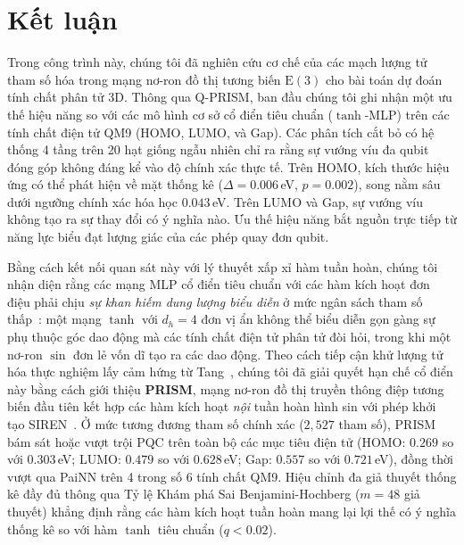 \documentclass[10pt,twocolumn,letterpaper]{article}
\begin{document}
\section{Kết luận}
\label{sec:conclusion}

Trong công trình này, chúng tôi đã nghiên cứu cơ chế của các mạch lượng tử tham số hóa trong mạng nơ-ron đồ thị tương biến $\mathrm{E}(3)$ cho bài toán dự đoán tính chất phân tử 3D.
Thông qua Q-PRISM, ban đầu chúng tôi ghi nhận một ưu thế hiệu năng so với các mô hình cơ sở cổ điển tiêu chuẩn ($\tanh$-MLP) trên các tính chất điện tử QM9 (HOMO, LUMO, và Gap).
Các phân tích cắt bỏ có hệ thống 4 tầng trên 20 hạt giống ngẫu nhiên chỉ ra rằng sự vướng víu đa qubit đóng góp không đáng kể vào độ chính xác thực tế. Trên HOMO, kích thước hiệu ứng có thể phát hiện về mặt thống kê ($\Delta = 0.006$\,eV, $p = 0.002$), song nằm sâu dưới ngưỡng chính xác hóa học $0.043$\,eV. Trên LUMO và Gap, sự vướng víu không tạo ra sự thay đổi có ý nghĩa nào. Ưu thế hiệu năng bắt nguồn trực tiếp từ năng lực biểu đạt lượng giác của các phép quay đơn qubit.

Bằng cách kết nối quan sát này với lý thuyết xấp xỉ hàm tuần hoàn, chúng tôi nhận diện rằng các mạng MLP cổ điển tiêu chuẩn với các hàm kích hoạt đơn điệu phải chịu \textit{sự khan hiếm dung lượng biểu diễn} ở mức ngân sách tham số thấp~\cite{rahaman2019spectral}: một mạng $\tanh$ với $d_h = 4$ đơn vị ẩn không thể biểu diễn gọn gàng sự phụ thuộc góc dao động mà các tính chất điện tử phân tử đòi hỏi, trong khi một nơ-ron $\sin$ đơn lẻ vốn dĩ tạo ra các dao động.
Theo cách tiếp cận khử lượng tử hóa thực nghiệm lấy cảm hứng từ Tang~\cite{Tang:2018lmw}, chúng tôi đã giải quyết hạn chế cổ điển này bằng cách giới thiệu \textbf{PRISM}, mạng nơ-ron đồ thị truyền thông điệp tương biến đầu tiên kết hợp các hàm kích hoạt \textit{nội} tuần hoàn hình sin với phép khởi tạo SIREN~\cite{sitzmann2020siren}.
Ở mức tương đương tham số chính xác ($2{,}527$ tham số), PRISM bám sát hoặc vượt trội PQC trên toàn bộ các mục tiêu điện tử (HOMO: $0.269$ so với $0.303$\,eV; LUMO: $0.479$ so với $0.628$\,eV; Gap: $0.557$ so với $0.721$\,eV), đồng thời vượt qua PaiNN trên 4 trong số 6 tính chất QM9.
Hiệu chỉnh đa giả thuyết thống kê đầy đủ thông qua Tỷ lệ Khám phá Sai Benjamini-Hochberg ($m = 48$ giả thuyết) khẳng định rằng các hàm kích hoạt tuần hoàn mang lại lợi thế có ý nghĩa thống kê so với hàm $\tanh$ tiêu chuẩn ($q < 0.02$).
\end{document}

